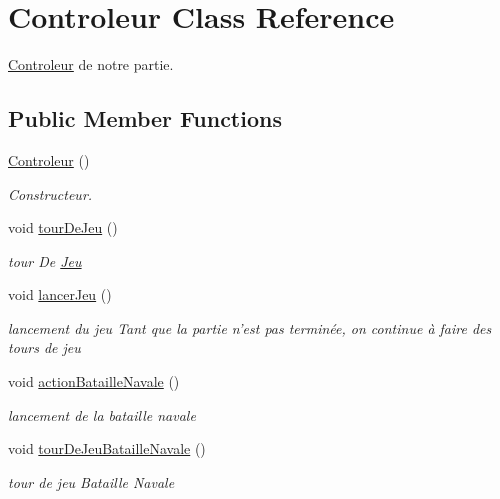 \hypertarget{classControleur}{\section{Controleur Class Reference}
\label{classControleur}
}


\hyperlink{classControleur}{Controleur} de notre partie.  


\subsection*{Public Member Functions}
\begin{DoxyCompactItemize}
\item 
\hyperlink{classControleur_a2b3859d8cb6bd1c0407be722962470bd}{Controleur} ()
\begin{DoxyCompactList}\small\item\em Constructeur. \end{DoxyCompactList}\item 
void \hyperlink{classControleur_a6662763d2f3225edcc192ccf19836a80}{tour\-De\-Jeu} ()
\begin{DoxyCompactList}\small\item\em tour De \hyperlink{classJeu}{Jeu} \end{DoxyCompactList}\item 
\hypertarget{classControleur_afe801f272c1edfa0a237695235be03ec}{void \hyperlink{classControleur_afe801f272c1edfa0a237695235be03ec}{lancer\-Jeu} ()}\label{classControleur_afe801f272c1edfa0a237695235be03ec}

\begin{DoxyCompactList}\small\item\em lancement du jeu Tant que la partie n'est pas terminée, on continue à faire des tours de jeu \end{DoxyCompactList}\item 
void \hyperlink{classControleur_abdb6d62a15b5446b0b9dfad333690d85}{action\-Bataille\-Navale} ()
\begin{DoxyCompactList}\small\item\em lancement de la bataille navale \end{DoxyCompactList}\item 
void \hyperlink{classControleur_a5b414b0306b79e3978c00f70089d796d}{tour\-De\-Jeu\-Bataille\-Navale} ()
\begin{DoxyCompactList}\small\item\em tour de jeu Bataille Navale \end{DoxyCompactList}\end{DoxyCompactItemize}


